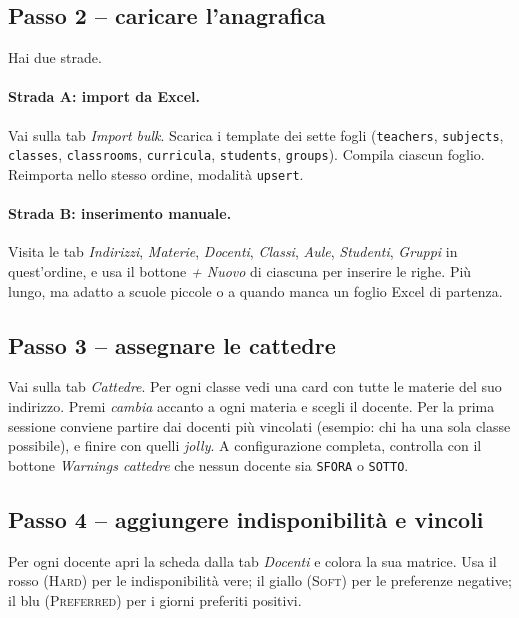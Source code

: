 \subsection{Passo 2 -- caricare l'anagrafica}

Hai due strade.

\paragraph{Strada A: import da Excel.}
Vai sulla tab \emph{Import bulk}. Scarica i template dei sette
fogli (\texttt{teachers}, \texttt{subjects}, \texttt{classes},
\texttt{classrooms}, \texttt{curricula}, \texttt{students},
\texttt{groups}). Compila ciascun foglio. Reimporta nello stesso
ordine, modalit\`a \texttt{upsert}.

\paragraph{Strada B: inserimento manuale.}
Visita le tab \emph{Indirizzi}, \emph{Materie}, \emph{Docenti},
\emph{Classi}, \emph{Aule}, \emph{Studenti}, \emph{Gruppi} in
quest'ordine, e usa il bottone \emph{+ Nuovo} di ciascuna per
inserire le righe. Pi\`u lungo, ma adatto a scuole piccole o a
quando manca un foglio Excel di partenza.

\subsection{Passo 3 -- assegnare le cattedre}

Vai sulla tab \emph{Cattedre}. Per ogni classe vedi una card
con tutte le materie del suo indirizzo. Premi \emph{cambia}
accanto a ogni materia e scegli il docente. Per la prima
sessione conviene partire dai docenti pi\`u vincolati (esempio:
chi ha una sola classe possibile), e finire con quelli
\emph{jolly}. A configurazione completa, controlla con il
bottone \emph{Warnings cattedre} che nessun docente sia
\texttt{SFORA} o \texttt{SOTTO}.

\subsection{Passo 4 -- aggiungere indisponibilit\`a e vincoli}

Per ogni docente apri la scheda dalla tab \emph{Docenti} e
colora la sua matrice. Usa il rosso (\textsc{Hard}) per le
indisponibilit\`a vere; il giallo (\textsc{Soft}) per le
preferenze negative; il blu (\textsc{Preferred}) per i giorni
preferiti positivi.

